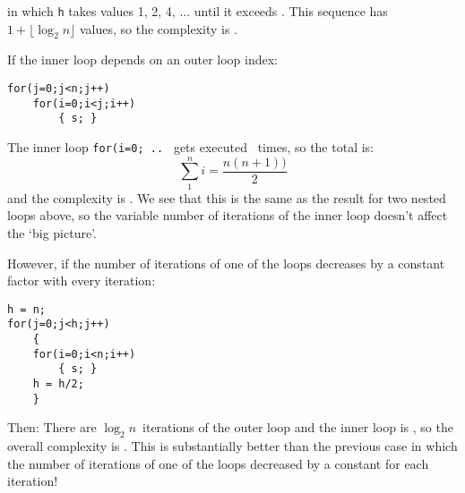 in which {\tt h} takes values 1, 2, 4, ... until it exceeds \nx.
This sequence has $1 + \lfloor{\log_2{n}\rfloor }$ values, so the 
complexity is .

If the inner loop depends on an outer loop index:
\begin{verbatim}
for(j=0;j<n;j++)
    for(i=0;i<j;i++)
        { s; }
\end{verbatim}
The inner loop {\tt for(i=0; .. } gets executed \ times, 
so the total is:
\[ \sum_1^n{i} = \frac{n(n+1))}{2} \]
and the complexity is .
We see that this is the same as the result for two nested 
loops above,
so the variable number of iterations of the inner loop 
doesn't affect the `big picture'.

However, if the number of iterations of one of the loops
decreases by a constant factor with every iteration:
\begin{verbatim}
h = n;
for(j=0;j<h;j++)
    {
    for(i=0;i<n;i++)
        { s; }
    h = h/2;
    }
\end{verbatim}
Then:
There are $\log_2{n}$\ iterations of the outer loop and the inner loop
is , so the overall complexity is
.
This is substantially better than the previous case in which the
number of iterations of one of the loops decreased by a constant
for each iteration!


